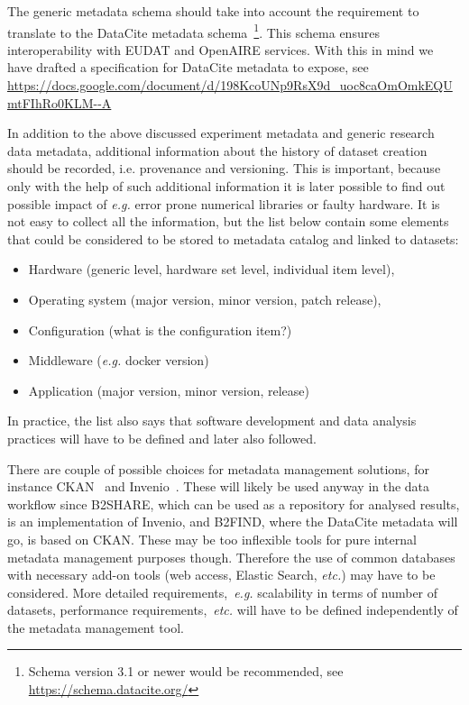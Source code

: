 \documentclass[12pt,a4paper]{article}
\begin{document}
The generic \ED metadata schema should take into account the requirement to translate to the DataCite metadata schema~\footnote{Schema version 3.1 or newer would be recommended, see \url{https://schema.datacite.org/}}. 
This schema ensures interoperability with EUDAT and OpenAIRE services.
With this in mind we have drafted a specification for DataCite metadata to expose, see %
\url{https://docs.google.com/document/d/198KcoUNp9RsX9d_uoc8caOmOmkEQUmtFIhRo0KLM--A}

In addition to the above discussed experiment metadata and generic research data metadata, additional information about the history of dataset creation should be recorded, i.e. provenance and versioning.
This is important, because only with the help of such additional information it is later possible to find out possible impact of 
\emph{e.g.} error prone numerical libraries
or faulty hardware. 
It is not easy to collect all the information, but the list below contain some elements that could be considered to be stored to metadata catalog and linked to datasets:
\begin{itemize}
    \item Hardware (generic level, hardware set level, individual item level),
    \item Operating system (major version, minor version, patch release), 
    \item Configuration (what is the configuration item?)
    \item Middleware (\emph{e.g.} docker version)
    \item Application (major version, minor version, release)
\end{itemize}
In practice, the list also says that \ED{} software development and data analysis  practices will have to be defined and later also followed.

There are couple of possible choices for metadata management solutions, for instance CKAN~\cite{ckan} and Invenio~\cite{invenio}. 
These will likely be used anyway in the \ED data workflow since B2SHARE, which can be used as a repository for analysed results, is an implementation of Invenio, and B2FIND, where the DataCite metadata will go, is based on CKAN. 
These may be too inflexible tools for pure internal metadata management purposes though. 
Therefore the use of common databases with necessary add-on tools (web access, Elastic Search, \emph{etc.}) may have to be considered. 
More detailed requirements,~\emph{e.g.} scalability in terms of number of datasets, performance requirements,~\emph{etc.} will have to be defined independently of the metadata management tool.
\end{document}

